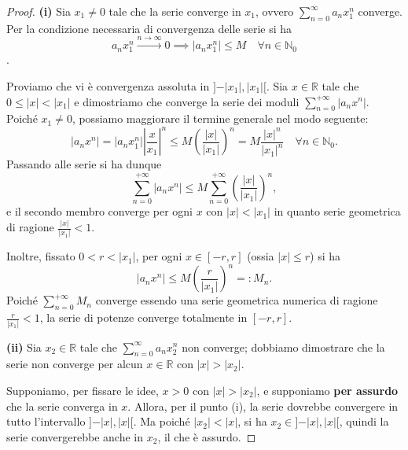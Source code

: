 \begin{proof}
\textbf{(i)} Sia $x_1 \neq 0$ tale che la serie converge in $x_1$, ovvero $\sum_{n=0}^{\infty} a_n x_1^n$ converge. Per la condizione necessaria di convergenza delle serie si ha
\[
a_n x_1^n \xrightarrow{n \to \infty} 0 \implies \vert a_n x_1^n \vert \le M \quad \forall n \in \mathbb{N}_0
\]
.

Proviamo che vi è convergenza assoluta in $]-\vert x_1 \vert, \vert x_1 \vert[$. Sia $x \in \mathbb{R}$ tale che $0 \le \vert x \vert < \vert x_1 \vert$ e dimostriamo che converge la serie dei moduli $\sum_{n=0}^{+\infty} \vert a_n x^n \vert$. Poiché $x_1 \neq 0$, possiamo maggiorare il termine generale nel modo seguente:
\[
\vert a_n x^n \vert = \vert a_n x_1^n \vert \left\vert \frac{x}{x_1} \right\vert^n \le M \left( \frac{\vert x \vert}{\vert x_1 \vert} \right)^n = M \frac{\vert x \vert^n}{\vert x_1 \vert^n} \quad \forall n \in \mathbb{N}_0.
\]
Passando alle serie si ha dunque
\[
\sum_{n=0}^{+\infty} \vert a_n x^n \vert \le M \sum_{n=0}^{+\infty} \left( \frac{\vert x \vert}{\vert x_1 \vert} \right)^n,
\]
e il secondo membro converge per ogni $x$ con $\vert x \vert < \vert x_1 \vert$ in quanto serie geometrica di ragione $\frac{\vert x \vert}{\vert x_1 \vert} < 1$.

Inoltre, fissato $0 < r < \vert x_1 \vert$, per ogni $x \in [-r, r]$ (ossia $\vert x \vert \le r$) si ha
\[
\vert a_n x^n \vert \le M \left( \frac{r}{\vert x_1 \vert} \right)^n =: M_n.
\]
Poiché $\sum_{n=0}^{+\infty} M_n$ converge essendo una serie geometrica numerica di ragione $\frac{r}{\vert x_1 \vert} < 1$, la serie di potenze converge totalmente in $[-r, r]$.

\textbf{(ii)} Sia $x_2 \in \mathbb{R}$ tale che $\sum_{n=0}^{\infty} a_n x_2^n$ non converge; dobbiamo dimostrare che la serie non converge per alcun $x \in \mathbb{R}$ con $\vert x \vert > \vert x_2 \vert$.

Supponiamo, per fissare le idee, $x > 0$  con $\vert x \vert > \vert x_2 \vert$, e supponiamo \textbf{per assurdo} che la serie converga in $x$. Allora, per il punto (i), la serie dovrebbe convergere in tutto l'intervallo $]-\vert x \vert, \vert x \vert[$. Ma poiché $\vert x_2 \vert < \vert x \vert$, si ha $x_2 \in ]-\vert x \vert, \vert x \vert[$, quindi la serie convergerebbe anche in $x_2$, il che è assurdo.
\end{proof}

